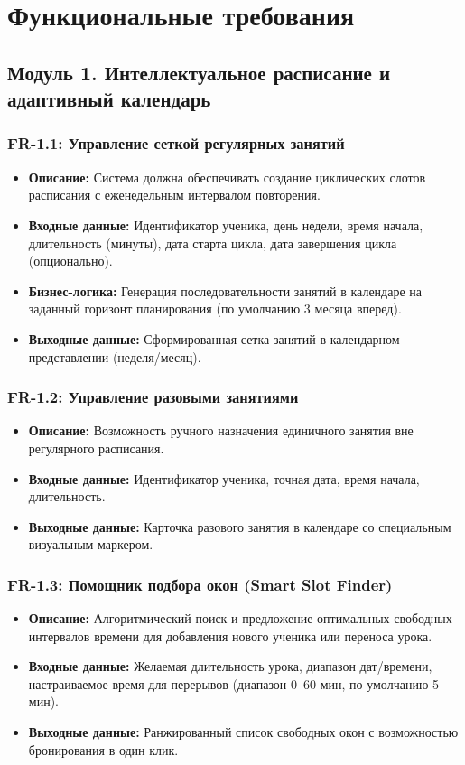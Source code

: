 \documentclass[12pt,a4paper]{article}
\begin{document}
\section{Функциональные требования}

\subsection{Модуль 1. Интеллектуальное расписание и адаптивный календарь}

\subsubsection*{FR-1.1: Управление сеткой регулярных занятий}
\begin{itemize}
    \item \textbf{Описание:} Система должна обеспечивать создание циклических слотов расписания с еженедельным интервалом повторения.
    \item \textbf{Входные данные:} Идентификатор ученика, день недели, время начала, длительность (минуты), дата старта цикла, дата завершения цикла (опционально).
    \item \textbf{Бизнес-логика:} Генерация последовательности занятий в календаре на заданный горизонт планирования (по умолчанию 3 месяца вперед).
    \item \textbf{Выходные данные:} Сформированная сетка занятий в календарном представлении (неделя/месяц).
\end{itemize}

\subsubsection*{FR-1.2: Управление разовыми занятиями}
\begin{itemize}
    \item \textbf{Описание:} Возможность ручного назначения единичного занятия вне регулярного расписания.
    \item \textbf{Входные данные:} Идентификатор ученика, точная дата, время начала, длительность.
    \item \textbf{Выходные данные:} Карточка разового занятия в календаре со специальным визуальным маркером.
\end{itemize}

\subsubsection*{FR-1.3: Помощник подбора окон (Smart Slot Finder)}
\begin{itemize}
    \item \textbf{Описание:} Алгоритмический поиск и предложение оптимальных свободных интервалов времени для добавления нового ученика или переноса урока.
    \item \textbf{Входные данные:} Желаемая длительность урока, диапазон дат/времени, настраиваемое время для перерывов (диапазон 0--60 мин, по умолчанию 5 мин).
    \item \textbf{Выходные данные:} Ранжированный список свободных окон с возможностью бронирования в один клик.
\end{itemize}
\end{document}
